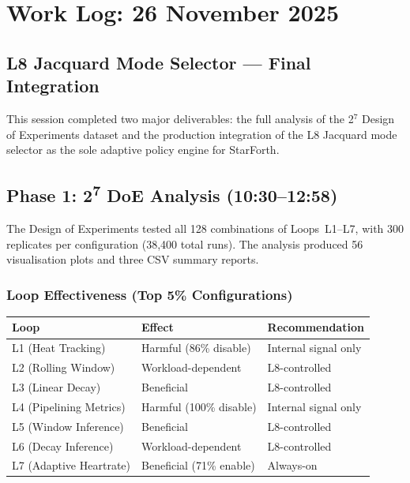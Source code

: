 
\section{Work Log: 26 November 2025}
\subsection*{L8 Jacquard Mode Selector — Final Integration}

This session completed two major deliverables: the full analysis of the
2$^7$ Design of Experiments dataset and the production integration of the
L8 Jacquard mode selector as the sole adaptive policy engine for StarForth.

\subsection{Phase 1: 2\textsuperscript{7} DoE Analysis (10:30--12:58)}

The Design of Experiments tested all 128 combinations of Loops~L1--L7,
with 300 replicates per configuration (38,400 total runs). The analysis
produced 56 visualisation plots and three CSV summary reports.

\subsubsection{Loop Effectiveness (Top 5\% Configurations)}

\begin{center}
\begin{tabular}{lll}
\toprule
Loop & Effect & Recommendation \\
\midrule
L1 (Heat Tracking)      & Harmful (86\% disable)  & Internal signal only \\
L2 (Rolling Window)     & Workload-dependent       & L8-controlled \\
L3 (Linear Decay)       & Beneficial               & L8-controlled \\
L4 (Pipelining Metrics) & Harmful (100\% disable)  & Internal signal only \\
L5 (Window Inference)   & Beneficial               & L8-controlled \\
L6 (Decay Inference)    & Workload-dependent       & L8-controlled \\
L7 (Adaptive Heartrate) & Beneficial (71\% enable) & Always-on \\
\bottomrule
\end{tabular}
\end{center}

